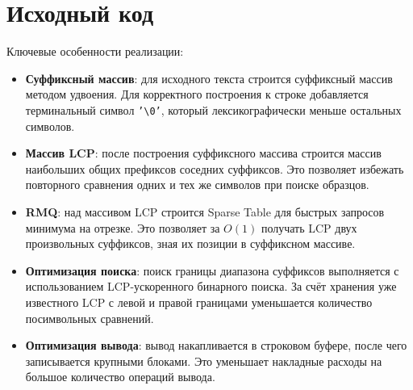 \section{Исходный код}

Ключевые особенности реализации:
\begin{itemize}
    \item \textbf{Суффиксный массив}: для исходного текста строится суффиксный массив методом удвоения. Для корректного построения к строке добавляется терминальный символ \texttt{'\textbackslash0'}, который лексикографически меньше остальных символов.

    \item \textbf{Массив LCP}: после построения суффиксного массива строится массив наибольших общих префиксов соседних суффиксов. Это позволяет избежать повторного сравнения одних и тех же символов при поиске образцов.

    \item \textbf{RMQ}: над массивом LCP строится Sparse Table для быстрых запросов минимума на отрезке. Это позволяет за \(O(1)\) получать LCP двух произвольных суффиксов, зная их позиции в суффиксном массиве.

    \item \textbf{Оптимизация поиска}: поиск границы диапазона суффиксов выполняется с использованием LCP-ускоренного бинарного поиска. За счёт хранения уже известного LCP с левой и правой границами уменьшается количество посимвольных сравнений.

    \item \textbf{Оптимизация вывода}: вывод накапливается в строковом буфере, после чего записывается крупными блоками. Это уменьшает накладные расходы на большое количество операций вывода.
\end{itemize}

